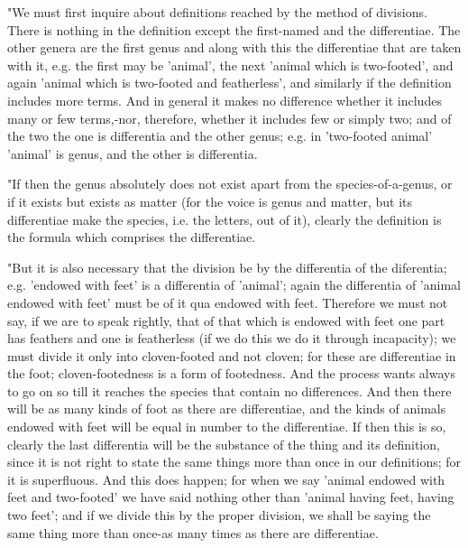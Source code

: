 "We must first inquire about definitions reached by the method of
divisions. There is nothing in the definition except the first-named
and the differentiae. The other genera are the first genus and along
with this the differentiae that are taken with it, e.g. the first
may be 'animal', the next 'animal which is two-footed', and again
'animal which is two-footed and featherless', and similarly if the
definition includes more terms. And in general it makes no difference
whether it includes many or few terms,-nor, therefore, whether it
includes few or simply two; and of the two the one is differentia
and the other genus; e.g. in 'two-footed animal' 'animal' is genus,
and the other is differentia. 

"If then the genus absolutely does not exist apart from the species-of-a-genus,
or if it exists but exists as matter (for the voice is genus and matter,
but its differentiae make the species, i.e. the letters, out of it),
clearly the definition is the formula which comprises the differentiae.

"But it is also necessary that the division be by the differentia
of the diferentia; e.g. 'endowed with feet' is a differentia of 'animal';
again the differentia of 'animal endowed with feet' must be of it
qua endowed with feet. Therefore we must not say, if we are to speak
rightly, that of that which is endowed with feet one part has feathers
and one is featherless (if we do this we do it through incapacity);
we must divide it only into cloven-footed and not cloven; for these
are differentiae in the foot; cloven-footedness is a form of footedness.
And the process wants always to go on so till it reaches the species
that contain no differences. And then there will be as many kinds
of foot as there are differentiae, and the kinds of animals endowed
with feet will be equal in number to the differentiae. If then this
is so, clearly the last differentia will be the substance of the thing
and its definition, since it is not right to state the same things
more than once in our definitions; for it is superfluous. And this
does happen; for when we say 'animal endowed with feet and two-footed'
we have said nothing other than 'animal having feet, having two feet';
and if we divide this by the proper division, we shall be saying the
same thing more than once-as many times as there are differentiae.

